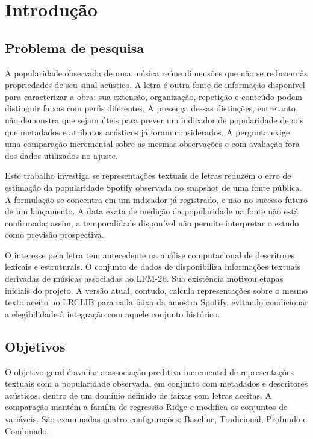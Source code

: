 \chapter{Introdução}\label{cap:introducao}
\section{Problema de pesquisa}
A popularidade observada de uma música reúne dimensões que não se reduzem às propriedades de seu sinal acústico. A letra é outra fonte de informação disponível para caracterizar a obra: sua extensão, organização, repetição e conteúdo podem distinguir faixas com perfis diferentes. A presença dessas distinções, entretanto, não demonstra que sejam úteis para prever um indicador de popularidade depois que metadados e atributos acústicos já foram considerados. A pergunta exige uma comparação incremental sobre as mesmas observações e com avaliação fora dos dados utilizados no ajuste.

Este trabalho investiga se representações textuais de letras reduzem o erro de estimação da popularidade Spotify observada no snapshot de uma fonte pública. A formulação se concentra em um indicador já registrado, e não no sucesso futuro de um lançamento. A data exata de medição da popularidade na fonte não está confirmada; assim, a temporalidade disponível não permite interpretar o estudo como previsão prospectiva.

O interesse pela letra tem antecedente na análise computacional de descritores lexicais e estruturais. O conjunto de dados de \citet{parada2024data} disponibiliza informações textuais derivadas de músicas associadas ao LFM-2b. Sua existência motivou etapas iniciais do projeto. A versão atual, contudo, calcula representações sobre o mesmo texto aceito no LRCLIB para cada faixa da amostra Spotify, evitando condicionar a elegibilidade à integração com aquele conjunto histórico.

\section{Objetivos}
O objetivo geral é avaliar a associação preditiva incremental de representações textuais com a popularidade observada, em conjunto com metadados e descritores acústicos, dentro de um domínio definido de faixas com letras aceitas. A comparação mantém a família de regressão Ridge e modifica os conjuntos de variáveis. São examinadas quatro configurações: Baseline, Tradicional, Profundo e Combinado.


